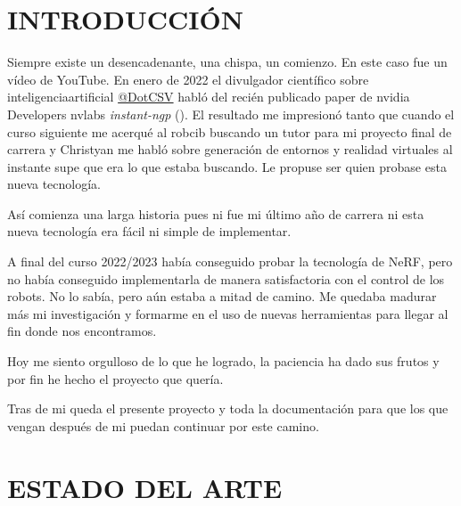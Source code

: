 \documentclass[a4paper, 12pt, spanish, twoside]{article}
\begin{document}

\newpage
\section{INTRODUCCIÓN} \label{sec:introduccion}

Siempre existe un desencadenante, una chispa, un comienzo. En este caso fue un vídeo de YouTube. En enero de 2022 el divulgador científico sobre \gls{inteligenciaartificial} \href{https://www.youtube.com/@DotCSV}{@DotCSV} habló del recién publicado paper de \gls{nvidia} Developers \gls{nvlabs} \textit{\gls{instant-ngp}} (\cite{mueller2022instant}). El resultado me impresionó tanto que cuando el curso siguiente me acerqué al \acrfull{robcib} buscando un tutor para mi proyecto final de carrera y Christyan me habló sobre generación de entornos y realidad virtuales al instante supe que era lo que estaba buscando. Le propuse ser quien probase esta nueva tecnología. 

Así comienza una larga historia pues ni fue mi último año de carrera ni esta nueva tecnología era fácil ni simple de implementar. 

A final del curso 2022/2023 había conseguido probar la tecnología de NeRF, pero no había conseguido implementarla de manera satisfactoria con el control de los robots. No lo sabía, pero aún estaba a mitad de camino. Me quedaba madurar más mi investigación y formarme en el uso de nuevas herramientas para llegar al fin donde nos encontramos. 

Hoy me siento orgulloso de lo que he logrado, la paciencia ha dado sus frutos y por fin he hecho el proyecto que quería.  

Tras de mi queda el presente proyecto y toda la documentación para que los que vengan después de mi puedan continuar por este camino.  

\clearpage





\newpage
\section{ESTADO DEL ARTE} \label{sec:estado_del_arte}
\end{document}
